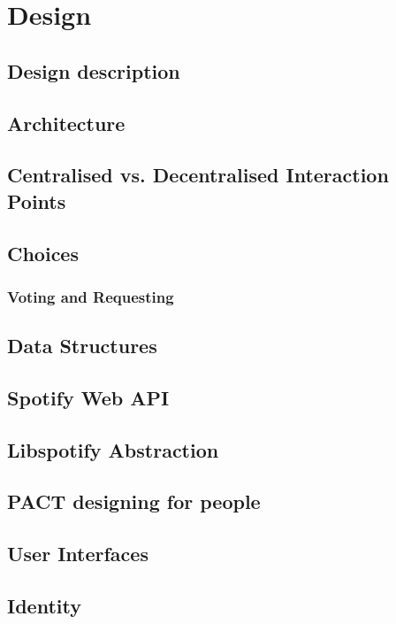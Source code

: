 \chapter{Design}


\section{Design description}


\section{Architecture}


\section{Centralised vs. Decentralised Interaction Points}


\section{Choices}



\subsection{Voting and Requesting}


\section{Data Structures}




\section{Spotify Web API}


\section{Libspotify Abstraction}


\section{PACT designing for people}


\section{User Interfaces}


\section{Identity}

